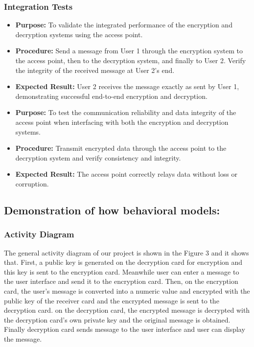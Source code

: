 \documentclass[12pt]{article}
\begin{document}
\subsubsection*{Integration Tests}

	\begin{itemize}
		\item \textbf{Purpose:} To validate the integrated performance of the encryption and decryption systems using the access point.
		\item \textbf{Procedure:} Send a message from User 1 through the encryption system to the access point, then to the decryption system, and finally to User 2. Verify the integrity of the received message at User 2's end.
		\item \textbf{Expected Result:} User 2 receives the message exactly as sent by User 1, demonstrating successful end-to-end encryption and decryption.
	\end{itemize}
	
	\begin{itemize}
		\item \textbf{Purpose:} To test the communication reliability and data integrity of the access point when interfacing with both the encryption and decryption systems.
		\item \textbf{Procedure:} Transmit encrypted data through the access point to the decryption system and verify consistency and integrity.
		\item \textbf{Expected Result:} The access point correctly relays data without loss or corruption.
	\end{itemize}

\newpage
\subsection{Demonstration of how behavioral models:}
	
	\subsubsection{Activity Diagram}
	
 The general activity diagram of our project is shown in the Figure 3 and it shows that. First, a public key is generated on the decryption card for encryption and this key is sent to the encryption card. Meanwhile user can enter a message to the user interface and send it to the encryption card. Then, on the encryption card, the user's message is converted into a numeric value and encrypted with the public key of the receiver card and the encrypted message is sent to the decryption card. on the decryption card, the encrypted message is decrypted with the decryption card's own private key and the original message is obtained. Finally decryption card sends message to the user interface and user can display the message.
 
\end{document}
